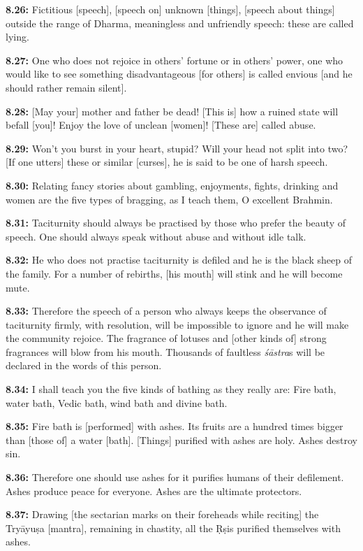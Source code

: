 \documentclass{article}
\newcommand{\vsnum}[1]{\textbf{#1}}
\newcommand{\skt}[1]{\textit{#1}}
\begin{document}
\vsnum{8.26: }Fictitious [speech], [speech on] unknown [things], [speech about things] outside the range of Dharma, meaningless and unfriendly speech: these are called lying.

\vsnum{8.27: }One who does not rejoice in others' fortune or in others' power, one who would like to see something disadvantageous [for others] is called envious [and he should rather remain silent].

\vsnum{8.28: }[May your] mother and father be dead! [This is] how a ruined state will befall [you]! Enjoy the love of unclean [women]! [These are] called abuse.

\vsnum{8.29: }Won't you burst in your heart, stupid? Will your head not split into two? [If one utters] these or similar [curses], he is said to be one of harsh speech.

\vsnum{8.30: }Relating fancy stories about gambling, enjoyments, fights, drinking and women are the five types of bragging, as I teach them, O excellent Brahmin.

\vsnum{8.31: }Taciturnity should always be practised by those who prefer the beauty of speech. One should always speak without abuse and without idle talk.

\vsnum{8.32: }He who does not practise taciturnity is defiled and he is the black sheep of the family. For a number of rebirths, [his mouth] will stink and he will become mute.

\vsnum{8.33: }Therefore the speech of a person who always keeps the observance of taciturnity firmly, with resolution, will be impossible to ignore and he will make the community rejoice. The fragrance of lotuses and [other kinds of] strong fragrances will blow from his mouth. Thousands of faultless \skt{śāstra}s will be declared in the words of this person.

\vsnum{8.34: }I shall teach you the five kinds of bathing as they really are: Fire bath, water bath, Vedic bath, wind bath and divine bath.

\vsnum{8.35: }Fire bath is [performed] with ashes. Its fruits are a hundred times bigger than [those of] a water [bath]. [Things] purified with ashes are holy. Ashes destroy sin.

\vsnum{8.36: }Therefore one should use ashes for it purifies humans of their defilement. Ashes produce peace for everyone. Ashes are the ultimate protectors.

\vsnum{8.37: }Drawing [the sectarian marks on their foreheads while reciting] the Tryāyuṣa [mantra], remaining in chastity, all the Ṛṣis purified themselves with ashes.
\end{document}
